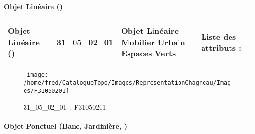 \documentclass[12pt,titlepage,oneside]{book}
\begin{document}
\paragraph{Objet Linéaire ()}
\noindent
\vspace{\baselineskip}

\renewcommand{\arraystretch}{1.2}
\begin{supertabular}{|p{10cm}|c|p{13cm}|p{12cm}|}
 Objet Linéaire () & 31\_05\_02\_01 & Objet Linéaire Mobilier Urbain Espaces Verts & Liste des attributs :
\begin{enumerate}
\end{enumerate}
\\
\hline
\end{supertabular}
\begin{figure}[h!]
  \hfill         %
  \begin{minipage}[t]{3cm}
    \begin{center}
      \texttt{[image: /home/fred/CatalogueTopo/Images/RepresentationChagneau/Images/F31050201]}
      \caption[~31\_05\_02\_01]{\small{31\_05\_02\_01~:} \tiny{F31050201}}\label{F31050201}
    \end{center}
  \end{minipage}
\end{figure}


\paragraph{Objet Ponctuel (Banc, Jardinière,  )}
\noindent
\vspace{\baselineskip}
\end{document}
